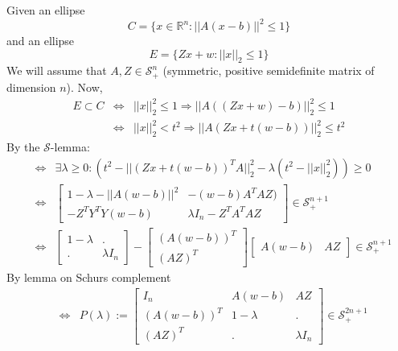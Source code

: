 \documentclass{article}
\begin{document}
Given an ellipse 
\[
  C = \{ x\in\mathbb{R}^n : ||A(x-b)||^2 \leq 1 \}
\]
and an ellipse
\[
  E = \{ Zx+w : ||x||_2 \leq 1 \}
\]
We will assume that $A,Z \in\mathcal{S}^n_+$ (symmetric, positive semidefinite matrix of dimension $n$).
Now, 
\begin{eqnarray}
    E \subset C 
    & \Leftrightarrow & ||x||_2^2 \leq 1 \Rightarrow || A((Zx+w)-b) ||_2^2 \leq 1 \\
    & \Leftrightarrow & ||x||_2^2 < t^2 \Rightarrow ||A(Zx+t(w-b))||_2^2 \leq t^2 
\end{eqnarray}
By the $\mathcal{S}$-lemma:
\begin{eqnarray}
    & \Leftrightarrow & \exists\lambda\geq 0: \left( t^2 - || (Zx+t(w-b))^TA ||_2^2 -\lambda(t^2 - ||x||_2^2) \right) \geq 0 \\
    &\Leftrightarrow & 
    \left[
        \begin{array}{cc}
            1-\lambda-|| A(w-b) ||^2 & -(w-b)A^TAZ) \\
            -Z^TY^TY(w-b)            & \lambda I_n - Z^TA^TAZ
        \end{array}
    \right] \in\mathcal{S}^{n+1}_+\\
    &\Leftrightarrow & 
    \left[
        \begin{array}{cc}
            1-\lambda & . \\
            . & \lambda I_n 
        \end{array}
    \right]
    -
    \left[
        \begin{array}{c}
            (A(w-b))^T \\
            (AZ)^T
        \end{array}
    \right]
    \left[
        \begin{array}{cc}
            A(w-b) & AZ
        \end{array}
    \right]\in\mathcal{S}^{n+1}_+
\end{eqnarray}
By lemma on Schurs complement
\begin{eqnarray}
& \Leftrightarrow & 
    P(\lambda) := \left[
        \begin{array}{ccc}
            I_n & A(w-b) & AZ \\
            (A(w-b))^T & 1-\lambda & . \\
            (AZ)^T & . & \lambda I_n
        \end{array}
    \right]\in\mathcal{S}^{2n+1}_+
\end{eqnarray}
\end{document}
